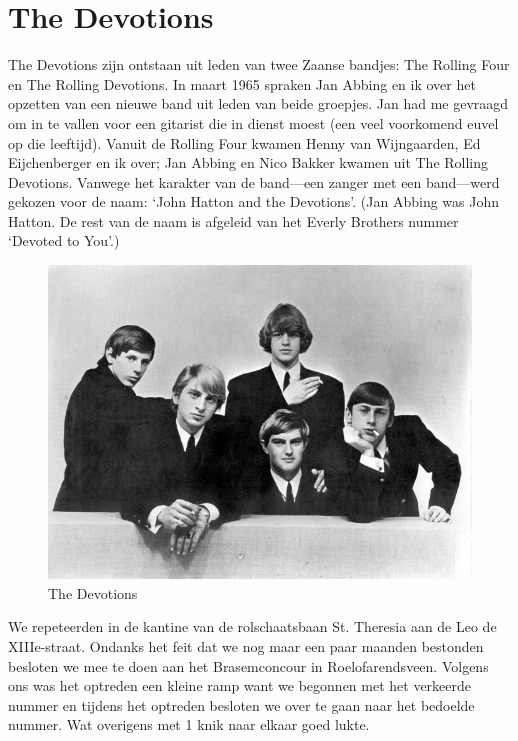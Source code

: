 \documentclass[12pt,twoside, openright]{memoir}
\begin{document}
\chapter{The Devotions} %
\label{cha:devotions}

The Devotions zijn ontstaan uit leden van twee Zaanse bandjes: The Rolling Four en The Rolling Devotions. In maart 1965 spraken Jan Abbing en ik over het opzetten van een nieuwe band uit leden van beide groepjes. Jan had me gevraagd om in te vallen voor een gitarist die in dienst moest (een veel voorkomend euvel op die leeftijd). Vanuit de Rolling Four kwamen Henny van Wijngaarden, Ed Eijchenberger en ik over; Jan Abbing en Nico Bakker kwamen uit The Rolling Devotions. Vanwege het karakter van de band---een zanger met een band---werd gekozen voor de naam: `John Hatton and the Devotions'. (Jan Abbing was John Hatton. De rest van de naam is afgeleid van het Everly Brothers nummer `Devoted to You'.)


\begin{figure}
\includegraphics[width=\textwidth]{img/ch27/promo3a}
\caption*{\footnotesize The Devotions}
\end{figure}

We repeteerden in de kantine van de rolschaatsbaan St. Theresia aan de Leo de XIIIe-straat. Ondanks het feit dat we nog maar een paar maanden bestonden besloten we mee te doen aan het Brasemconcour in Roelofarendsveen. Volgens ons was het optreden een kleine ramp want we begonnen met het verkeerde nummer en tijdens het optreden besloten we over te gaan naar het bedoelde nummer. Wat overigens met 1 knik naar elkaar goed lukte. 
\end{document}
